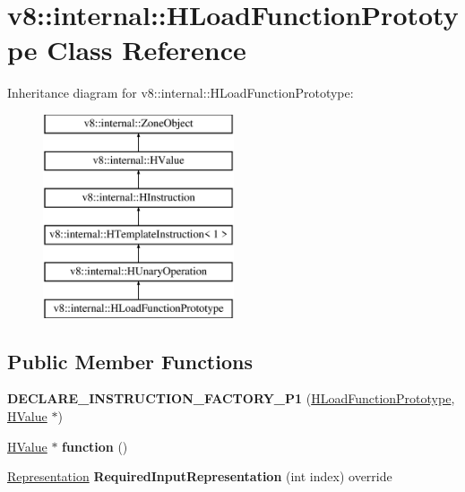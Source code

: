 \hypertarget{classv8_1_1internal_1_1_h_load_function_prototype}{}\section{v8\+:\+:internal\+:\+:H\+Load\+Function\+Prototype Class Reference}
\label{classv8_1_1internal_1_1_h_load_function_prototype}
Inheritance diagram for v8\+:\+:internal\+:\+:H\+Load\+Function\+Prototype\+:\begin{figure}[H]
\begin{center}
\leavevmode
\includegraphics[height=6.000000cm]{classv8_1_1internal_1_1_h_load_function_prototype}
\end{center}
\end{figure}
\subsection*{Public Member Functions}
\begin{DoxyCompactItemize}
\item 
{\bfseries D\+E\+C\+L\+A\+R\+E\+\_\+\+I\+N\+S\+T\+R\+U\+C\+T\+I\+O\+N\+\_\+\+F\+A\+C\+T\+O\+R\+Y\+\_\+\+P1} (\hyperlink{classv8_1_1internal_1_1_h_load_function_prototype}{H\+Load\+Function\+Prototype}, \hyperlink{classv8_1_1internal_1_1_h_value}{H\+Value} $\ast$)\hypertarget{classv8_1_1internal_1_1_h_load_function_prototype_adfafe20224b8f50f2f8422ed86ec33b5}{}\label{classv8_1_1internal_1_1_h_load_function_prototype_adfafe20224b8f50f2f8422ed86ec33b5}

\item 
\hyperlink{classv8_1_1internal_1_1_h_value}{H\+Value} $\ast$ {\bfseries function} ()\hypertarget{classv8_1_1internal_1_1_h_load_function_prototype_ac71bf66970dc054480e8821f1878a433}{}\label{classv8_1_1internal_1_1_h_load_function_prototype_ac71bf66970dc054480e8821f1878a433}

\item 
\hyperlink{classv8_1_1internal_1_1_representation}{Representation} {\bfseries Required\+Input\+Representation} (int index) override\hypertarget{classv8_1_1internal_1_1_h_load_function_prototype_a7eb7fe26c55132e7c316ae3275c99fd6}{}\label{classv8_1_1internal_1_1_h_load_function_prototype_a7eb7fe26c55132e7c316ae3275c99fd6}

\end{DoxyCompactItemize}
